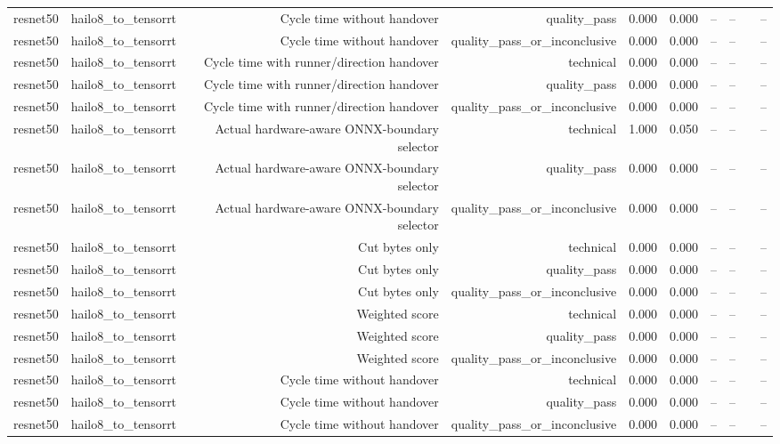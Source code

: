 \begin{table}[t]
\begin{tabular}{lrrrrrrrrr}
resnet50 & hailo8\_to\_tensorrt & Cycle time without handover & quality\_pass & 0.000 & 0.000 & -- & -- &  & -- \\
resnet50 & hailo8\_to\_tensorrt & Cycle time without handover & quality\_pass\_or\_inconclusive & 0.000 & 0.000 & -- & -- &  & -- \\
resnet50 & hailo8\_to\_tensorrt & Cycle time with runner/direction handover & technical & 0.000 & 0.000 & -- & -- &  & -- \\
resnet50 & hailo8\_to\_tensorrt & Cycle time with runner/direction handover & quality\_pass & 0.000 & 0.000 & -- & -- &  & -- \\
resnet50 & hailo8\_to\_tensorrt & Cycle time with runner/direction handover & quality\_pass\_or\_inconclusive & 0.000 & 0.000 & -- & -- &  & -- \\
resnet50 & hailo8\_to\_tensorrt & Actual hardware-aware ONNX-boundary selector & technical & 1.000 & 0.050 & -- & -- &  & -- \\
resnet50 & hailo8\_to\_tensorrt & Actual hardware-aware ONNX-boundary selector & quality\_pass & 0.000 & 0.000 & -- & -- &  & -- \\
resnet50 & hailo8\_to\_tensorrt & Actual hardware-aware ONNX-boundary selector & quality\_pass\_or\_inconclusive & 0.000 & 0.000 & -- & -- &  & -- \\
resnet50 & hailo8\_to\_tensorrt & Cut bytes only & technical & 0.000 & 0.000 & -- & -- &  & -- \\
resnet50 & hailo8\_to\_tensorrt & Cut bytes only & quality\_pass & 0.000 & 0.000 & -- & -- &  & -- \\
resnet50 & hailo8\_to\_tensorrt & Cut bytes only & quality\_pass\_or\_inconclusive & 0.000 & 0.000 & -- & -- &  & -- \\
resnet50 & hailo8\_to\_tensorrt & Weighted score & technical & 0.000 & 0.000 & -- & -- &  & -- \\
resnet50 & hailo8\_to\_tensorrt & Weighted score & quality\_pass & 0.000 & 0.000 & -- & -- &  & -- \\
resnet50 & hailo8\_to\_tensorrt & Weighted score & quality\_pass\_or\_inconclusive & 0.000 & 0.000 & -- & -- &  & -- \\
resnet50 & hailo8\_to\_tensorrt & Cycle time without handover & technical & 0.000 & 0.000 & -- & -- &  & -- \\
resnet50 & hailo8\_to\_tensorrt & Cycle time without handover & quality\_pass & 0.000 & 0.000 & -- & -- &  & -- \\
resnet50 & hailo8\_to\_tensorrt & Cycle time without handover & quality\_pass\_or\_inconclusive & 0.000 & 0.000 & -- & -- &  & -- \\

\end{tabular}
\end{table}
